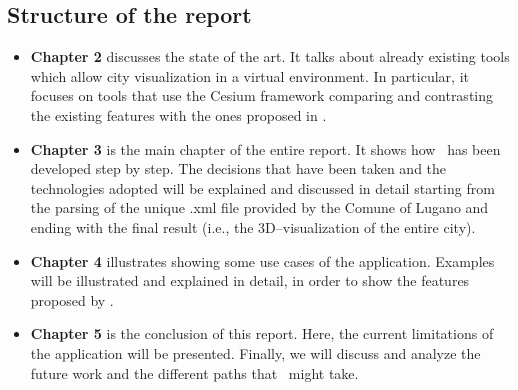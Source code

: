 \subsection{Structure of the report}
\begin{itemize}
	\item {\bf Chapter 2} discusses the state of the art. It talks about already existing tools which allow city visualization in a virtual environment. In particular, it focuses on tools that use the Cesium framework comparing and contrasting the existing features with the ones proposed in \applicationName.
	\item {\bf Chapter 3} is the main chapter of the entire report. It shows how \applicationName\ has been developed step by step. The decisions that have been taken and the technologies adopted will be explained and discussed in detail starting from the parsing of the unique .xml file provided by the Comune of Lugano and ending with the final result (i.e., the 3D--visualization of the entire city). 
	\item {\bf Chapter 4} illustrates showing some use cases of the application. Examples will be illustrated and explained in detail, in order to show the features proposed by \applicationName. 
	\item {\bf Chapter 5} is the conclusion of this report. Here, the current limitations of the application will be presented. Finally, we will discuss and analyze the future work and the different paths that \applicationName\ might take.
\end{itemize}
